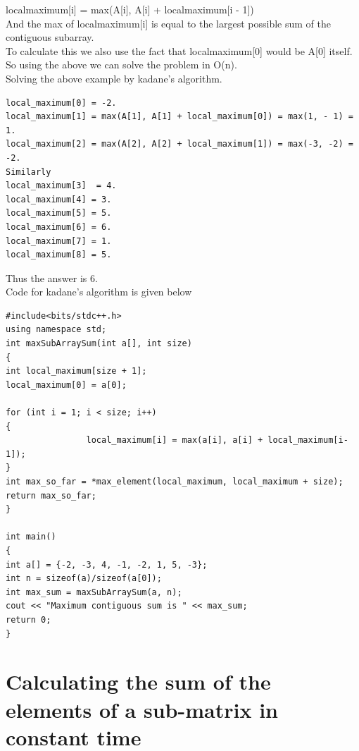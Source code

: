\documentclass[12pt]{book}
\begin{document}
\newline
localmaximum[i] = max(A[i], A[i] + localmaximum[i - 1])\\
And the max of localmaximum[i] is equal to the largest possible sum of the contiguous subarray.\\
To calculate this we also use the fact that localmaximum[0] would be A[0] itself.\\
\newline
So using the above we can solve the problem in O(n).\\
\newline
Solving the above example by kadane’s algorithm.\\
\newline
\begin{lstlisting}
local_maximum[0] = -2.
local_maximum[1] = max(A[1], A[1] + local_maximum[0]) = max(1, - 1) = 1.
local_maximum[2] = max(A[2], A[2] + local_maximum[1]) = max(-3, -2) = -2.
Similarly 
local_maximum[3]  = 4.
local_maximum[4] = 3.
local_maximum[5] = 5.
local_maximum[6] = 6.
local_maximum[7] = 1.
local_maximum[8] = 5.

\end{lstlisting}
Thus the answer is 6.\\
\newline
Code for kadane’s algorithm is given below\\
\newline
\begin{lstlisting}
#include<bits/stdc++.h>
using namespace std;
int maxSubArraySum(int a[], int size)
{
int local_maximum[size + 1];
local_maximum[0] = a[0];

for (int i = 1; i < size; i++)
{
                local_maximum[i] = max(a[i], a[i] + local_maximum[i-1]);
}
int max_so_far = *max_element(local_maximum, local_maximum + size);
return max_so_far;
}

int main()
{
int a[] = {-2, -3, 4, -1, -2, 1, 5, -3};
int n = sizeof(a)/sizeof(a[0]);
int max_sum = maxSubArraySum(a, n);
cout << "Maximum contiguous sum is " << max_sum;
return 0;
}

\end{lstlisting}

\chapter{Calculating the sum of the elements of a sub-matrix in constant time}
\end{document}
